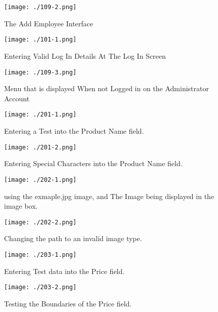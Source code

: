 \begin{figure}[H]
    \texttt{[image: ./109-2.png]}
    \caption{The Add Employee Interface} \label{fig:add_employee_interface}
\end{figure}

\begin{figure}[H]
    \texttt{[image: ./101-1.png]}
    \caption{Entering Valid Log In Details At The Log In Screen} \label{fig:valid_log_in_details}
\end{figure}

\begin{figure}[H]
    \texttt{[image: ./109-3.png]}
    \caption{Menu that is displayed When not Logged in on the Administrator Account} \label{fig:no_employee_menu}
\end{figure}

\begin{figure}[H]
    \texttt{[image: ./201-1.png]}
    \caption{Entering a Test into the Product Name field.} \label{fig: product_name}
\end{figure}

\begin{figure}[H]
    \texttt{[image: ./201-2.png]}
    \caption{Entering Special Characters into the Product Name field.} \label{fig: special_char_product_name}
\end{figure}

\begin{figure}[H]
    \texttt{[image: ./202-1.png]}
    \caption{using the exmaple.jpg image, and The Image being displayed in the image box.} \label{fig: image_example}
\end{figure}

\begin{figure}[H]
    \texttt{[image: ./202-2.png]}
    \caption{Changing the path to an invalid image type.} \label{fig: invalid_image}
\end{figure}

\begin{figure}[H]
    \texttt{[image: ./203-1.png]}
    \caption{Entering Test data into the Price field.} \label{fig: price_test}
\end{figure}

\begin{figure}[H]
    \texttt{[image: ./203-2.png]}
    \caption{Testing the Boundaries of the Price field.} \label{fig: price_boundary}
\end{figure}

